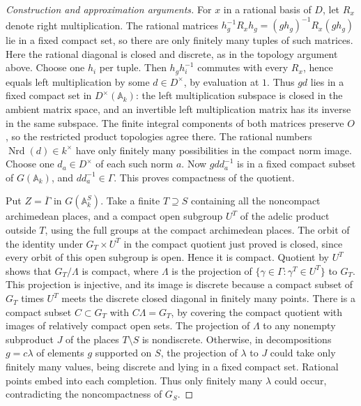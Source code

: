 \documentclass[11pt,a4paper,openany,oneside]{book}
\theoremstyle{resultstyle}
\theoremstyle{definition}
\numberwithin{equation}{chapter}
\begin{document}
\begin{proof}[Construction and approximation arguments]
For \(x\) in a rational basis of \(D\), let \(R_x\) denote right
multiplication. The rational matrices
\(h_g^{-1}R_xh_g=(g h_g)^{-1}R_x(g h_g)\) lie in a fixed compact
set, so there are only finitely many tuples of such matrices.
Here the rational diagonal is closed and discrete, as in the
topology argument above. Choose one \(h_i\) per tuple. Then
\(h_g h_i^{-1}\) commutes with every \(R_x\), hence equals left
multiplication by some \(d\in D^\times\), by evaluation at \(1\).
Thus \(gd\) lies in a fixed compact set in \(D^\times(\mathbb A_k)\):
the left multiplication subspace is closed in the ambient matrix
space, and an invertible left multiplication matrix has its
inverse in the same subspace. The finite integral components of
both matrices preserve \(O\), so the restricted product topologies
agree there. The rational numbers \(\operatorname{Nrd}(d)\in
k^\times\) have only finitely many possibilities in the compact
norm image. Choose one \(d_a\in D^\times\) of each such norm
\(a\). Now \(gdd_a^{-1}\) is in a fixed compact subset of
\(G(\mathbb A_k)\), and \(dd_a^{-1}\in\Gamma\). This proves
compactness of the quotient.

Put \(Z=\overline{\Gamma}\) in \(G(\mathbb A_k^S)\). Take a finite
\(T\supseteq S\) containing all the noncompact archimedean places,
and a compact open subgroup \(U^T\) of the adelic product outside
\(T\), using the full groups at the compact archimedean places.
The orbit of the identity under \(G_T\times U^T\) in the compact
quotient just proved is closed, since every orbit of this open
subgroup is open. Hence it is compact. Quotient by \(U^T\) shows
that \(G_T/\Lambda\) is compact, where \(\Lambda\) is the projection
of \(\{\gamma\in\Gamma:\gamma^T\in U^T\}\) to \(G_T\).
This projection is injective, and its image is discrete because
a compact subset of \(G_T\) times \(U^T\) meets the discrete closed
diagonal in finitely many points. There is a compact subset
\(C\subset G_T\) with \(C\Lambda=G_T\), by covering the compact
quotient with images of relatively compact open sets. The
projection of \(\Lambda\) to any nonempty subproduct \(J\) of the
places \(T\setminus S\) is nondiscrete. Otherwise, in decompositions
\(g=c\lambda\) of elements \(g\) supported on \(S\), the projection
of \(\lambda\) to \(J\) could take only finitely many values, being
discrete and lying in a fixed compact set. Rational points embed
into each completion. Thus only finitely many \(\lambda\) could
occur, contradicting the noncompactness of \(G_S\).


\end{proof}
\end{document}
